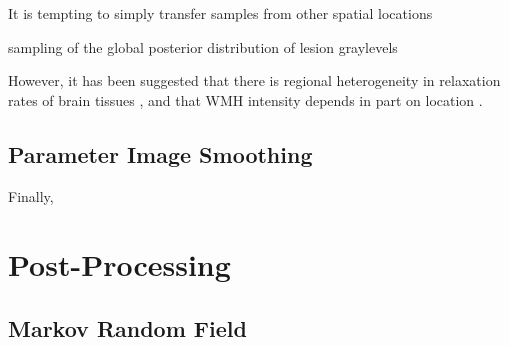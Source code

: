It is tempting to simply transfer samples from other spatial locations 

sampling of the global posterior distribution of lesion graylevels



However, it has been suggested that there is regional heterogeneity in relaxation rates of brain tissues \cite{Sled2004}, and that WMH intensity depends in part on location \cite{Stevenson2000}.


\subsection{Parameter Image Smoothing}
Finally, 

\section{Post-Processing}
\subsection{Markov Random Field}
